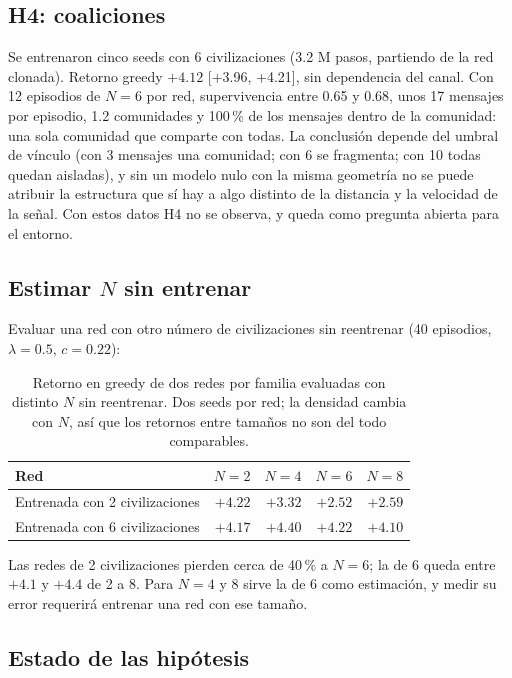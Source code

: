\documentclass[11pt,a4paper]{article}
\begin{document}
\subsection{H4: coaliciones}

Se entrenaron cinco seeds con 6 civilizaciones (3.2 M pasos, partiendo de la red clonada). Retorno greedy $+4.12$ [+3.96, +4.21], sin dependencia del canal. Con 12 episodios de $N=6$ por red, supervivencia entre 0.65 y 0.68, unos 17 mensajes por episodio, 1.2 comunidades y 100\,\% de los mensajes dentro de la comunidad: una sola comunidad que comparte con todas. La conclusi\'on depende del umbral de v\'inculo (con 3 mensajes una comunidad; con 6 se fragmenta; con 10 todas quedan aisladas), y sin un modelo nulo con la misma geometr\'ia no se puede atribuir la estructura que s\'i hay a algo distinto de la distancia y la velocidad de la se\~nal. Con estos datos H4 no se observa, y queda como pregunta abierta para el entorno.

\subsection{Estimar $N$ sin entrenar}

Evaluar una red con otro n\'umero de civilizaciones sin reentrenar (40 episodios, $\lambda=0.5$, $c=0.22$):

\begin{table}[H]
\centering\small
\begin{tabular}{@{}lrrrr@{}}
\toprule
Red & $N=2$ & $N=4$ & $N=6$ & $N=8$ \\
\midrule
Entrenada con 2 civilizaciones & $+4.22$ & $+3.32$ & $+2.52$ & $+2.59$ \\
Entrenada con 6 civilizaciones & $+4.17$ & $+4.40$ & $+4.22$ & $+4.10$ \\
\bottomrule
\end{tabular}
\caption{Retorno en greedy de dos redes por familia evaluadas con distinto $N$ sin reentrenar. Dos seeds por red; la densidad cambia con $N$, as\'i que los retornos entre tama\~nos no son del todo comparables.}
\end{table}

Las redes de 2 civilizaciones pierden cerca de 40\,\% a $N=6$; la de 6 queda entre $+4.1$ y $+4.4$ de 2 a 8. Para $N=4$ y 8 sirve la de 6 como estimaci\'on, y medir su error requerir\'a entrenar una red con ese tama\~no.

\subsection{Estado de las hip\'otesis}
\end{document}
